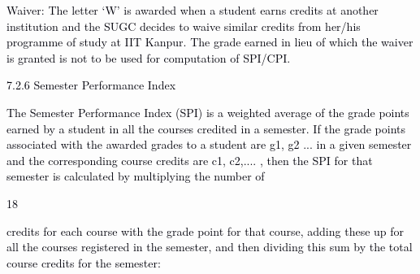 \documentclass[12pt]{article}
\begin{document}
\vspace{\baselineskip}
\begin{adjustwidth}{0.5in}{0.0in}
\begin{justify}
{\fontsize{10pt}{12.0pt}\selectfont \textcolor[HTML]{00000A}{Waiver: The letter `W' is awarded when a student earns credits at another institution and the SUGC decides to waive similar credits from her/his programme of study at IIT Kanpur. The grade earned in lieu of which the waiver is granted is not to be used for computation of SPI/CPI.}\par}
\end{justify}\par

\end{adjustwidth}


\vspace{\baselineskip}

\vspace{\baselineskip}

\vspace{\baselineskip}

\vspace{\baselineskip}
{\fontsize{10pt}{12.0pt}\selectfont \textcolor[HTML]{00000A}{7.2.6 Semester Performance Index}\par}\par


\vspace{\baselineskip}
\begin{justify}
{\fontsize{9pt}{10.8pt}\selectfont \textcolor[HTML]{00000A}{The Semester Performance Index (SPI) is a weighted average of the grade points earned by a student in all the courses credited in a semester. If the grade points associated with the awarded grades to a student are g1, g2 ... in a given semester and the corresponding course credits are c1, c2,.... , then the SPI for that semester is calculated by multiplying the number of}\par}
\end{justify}\par


\vspace{\baselineskip}
\begin{Center}
\textcolor[HTML]{00000A}{18}
\end{Center}\par


\vspace{\baselineskip}
\begin{adjustwidth}{0.0in}{0.01in}
{\fontsize{10pt}{12.0pt}\selectfont \textcolor[HTML]{00000A}{credits for each course with the grade point for that course, adding these up for all the courses registered in the semester, and then dividing this sum by the total course credits for the semester:}\par}\par

\end{adjustwidth}
\end{document}
